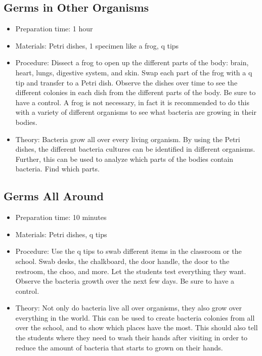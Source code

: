 \subsection{Germs in Other Organisms}
\begin{itemize}
\item{Preparation time: 1 hour}
\item{Materials: Petri dishes, 1 specimen like a frog, q tips}
\item{Procedure: Dissect a frog to open up the different parts of the body: brain, heart, lungs, digestive system, and skin. Swap each part of the frog with a q tip and transfer to a Petri dish. Observe the dishes over time to see the different colonies in each dish from the different parts of the body. Be sure to have a control. A frog is not necessary, in fact it is recommended to do this with a variety of different organisms to see what bacteria are growing in their bodies. }
\item{Theory: Bacteria grow all over every living organism. By using the Petri dishes, the different bacteria cultures can be identified in different organisms. Further, this can be used to analyze which parts of the bodies contain bacteria. Find which parts. }
\end{itemize}

\subsection{Germs All Around}
\begin{itemize}
\item{Preparation time: 10 minutes}
\item{Materials: Petri dishes, q tips}
\item{Procedure: Use the q tips to swab different items in the classroom or the school. Swab desks, the chalkboard, the door handle, the door to the restroom, the choo, and more. Let the students test everything they want. Observe the bacteria growth over the next few days. Be sure to have a control.}
\item{Theory: Not only do bacteria live all over organisms, they also grow over everything in the world. This can be used to create bacteria colonies from all over the school, and to show which places have the most. This should also tell the students where they need to wash their hands after visiting in order to reduce the amount of bacteria that starts to grown on their hands. }
\end{itemize}

